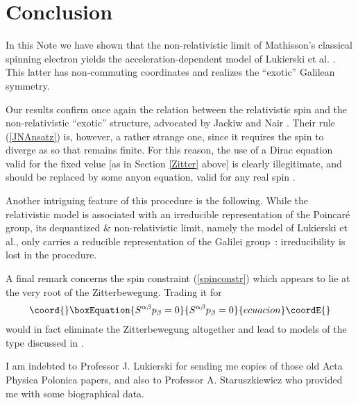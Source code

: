 \documentclass[a4paper,11pt]{article}
\let\ssection=\section
\renewcommand{\section}{\setcounter{equation}{0}\ssection}
\providecommand{\half}{{\scriptstyle{\frac{1}{2}}}}
\def\parag{\hfil\break} %
\def\kikezd{\parag\underbar}
\begin{document}
\section{Conclusion}

In this Note we have shown that the non-relativistic limit of
Mathisson's classical spinning electron yields
the acceleration-dependent model of Lukierski et al. \cite{LSZ}.
This latter has non-commuting coordinates and
  realizes the ``exotic'' Galilean symmetry.

Our results confirm once again the relation between the relativistic
spin and the non-relativistic ``exotic'' structure, advocated
  by Jackiw and Nair \cite{JaNa}.
Their rule (\ref{JNAnsatz}) is,
however, a rather strange one, since it requires
the spin to diverge as \coordHE{}
so that \coordHE{} remains finite.
For this reason, the use of a Dirac equation valid for the
fixed velue \myHighlight{$s=\half$}\coordHE{}
[as in Section \ref{Zitter} above] is clearly illegitimate, and should
be replaced by some anyon equation,
  valid for any real spin \coordHE{} \cite{aneq}.


Another intriguing feature of this procedure is the following.
While the relativistic model is  associated with an
irreducible representation of the Poincar\'e group,
its dequantized \& non-relativistic limit, namely
the model of Lukierski et al., only carries a
reducible representation of the Galilei group~:
irreducibility is lost in the procedure.

A final remark concerns the spin constraint
(\ref{spinconstr}) which appears to lie at
the very root of the Zitterbewegung. Trading it
for
\begin{equation}\coord{}\boxEquation{
     S^{\alpha\beta}p_{\beta}=0
     \label{Pspinconstr}
}{
     S^{\alpha\beta}p_{\beta}=0
     }{ecuacion}\coordE{}\end{equation}
would in fact eliminate the Zitterbewegung altogether and
lead to models of the type discussed in \cite{Dixon}.

\kikezd{\bf Acknowledgement.}
I am indebted to Professor
J. Lukierski for sending me
copies of those old Acta Physica Polonica  papers, and
also to Professor A. Staruszkiewicz
who provided me with some biographical data.
\end{document}
